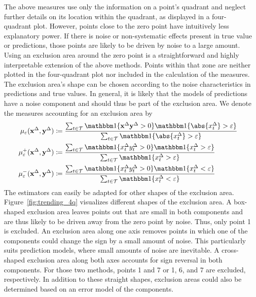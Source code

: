The above measures use only the information on a point's quadrant and neglect further details on its location within the quadrant, as displayed in a four-quadrant plot.
However, points close to the zero point have intuitively less explanatory power.
If there is noise or non-systematic effects present in true value or predictions, those points are likely to be driven by noise to a large amount. 
Using an exclusion area around the zero point is a straightforward and highly interpretable extension of the above methods.
Points within that zone are neither plotted in the four-quadrant plot nor included in the calculation of the measures.
The exclusion area's shape can be chosen according to the noise characteristics in predictions and true values.
In general, it is likely that the models of predictions have a noise component and should thus be part of the exclusion area.
We denote the measures accounting for an exclusion area by
\begin{align}
    \acceps (\diffx, \diffy) &\coloneqq \frac{\sum_{t \in \mathcal{T}} \ind{\diffx \diffy > 0} \ind{\abs{\diffxt} > \varepsilon}}{\sum_{t \in \mathcal{T}} \ind{\abs{\diffxt} > \varepsilon}}\label{eq:acceps}\\
    \accpeps (\diffx, \diffy) &\coloneqq \frac{\sum_{t \in \mathcal{T}} \ind{\diffxt \diffyt > 0} \ind{\diffxt > \varepsilon}}{\sum_{t \in \mathcal{T}} \ind{\diffxt > \varepsilon}} \label{eq:accpeps}\\
    \accmeps (\diffx, \diffy) &\coloneqq \frac{\sum_{t \in \mathcal{T}} \ind{\diffxt \diffyt > 0} \ind{\diffxt < \varepsilon}}{\sum_{t \in \mathcal{T}} \ind{\diffxt < \varepsilon }}\label{eq:accmeps}
\end{align}
The estimators can easily be adapted for other shapes of the exclusion area.
Figure~\ref{fig:trending_4q} visualizes different shapes of the exclusion area.
A box-shaped exclusion area leaves points out that are small in both components and are thus likely to be driven away from the zero point by noise.
Thus, only point 1 is excluded.
An exclusion area along one axis removes points in which one of the components could change the sign by a small amount of noise.
This particularly suits prediction models, where small amounts of noise are inevitable.
A cross-shaped exclusion area along both axes accounts for sign reversal in both components.
For those two methods, points 1 and 7 or 1, 6, and 7 are excluded, respectively.
In addition to these straight shapes, exclusion areas could also be determined based on an error model of the components.
